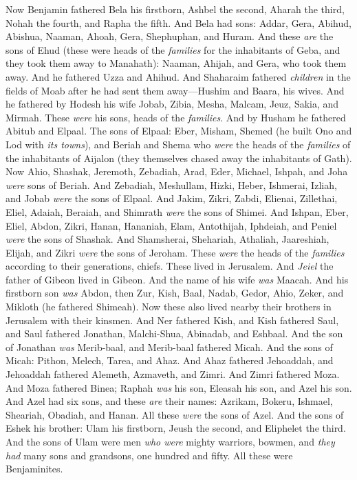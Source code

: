 \begin{biblechapter} %
 Now Benjamin fathered Bela his firstborn, Ashbel the second, Aharah the third,
\verse Nohah the fourth, and Rapha the fifth.
\verse And Bela had sons: Addar, Gera, Abihud,
\verse Abishua, Naaman, Ahoah,
\verse Gera, Shephuphan, and Huram.
\verse And these \textit{are} the sons of Ehud (these were heads of the \textit{families} for the inhabitants of Geba, and they took them away to Manahath):
\verse Naaman, Ahijah, and Gera, who took them away. And he fathered Uzza and Ahihud.
\verse And Shaharaim fathered \textit{children} in the fields of Moab after he had sent them away—Hushim and Baara, his wives.
\verse And he fathered by Hodesh his wife Jobab, Zibia, Mesha, Malcam,
\verse Jeuz, Sakia, and Mirmah. These \textit{were} his sons, heads of the \textit{families}.
\verse And by Husham he fathered Abitub and Elpaal.
\verse The sons of Elpaal: Eber, Misham, Shemed (he built Ono and Lod with \textit{its towns}),
\verse and Beriah and Shema who \textit{were} the heads of the \textit{families} of the inhabitants of Aijalon (they themselves chased away the inhabitants of Gath).
\verse Now Ahio, Shashak, Jeremoth,
\verse Zebadiah, Arad, Eder,
\verse Michael, Ishpah, and Joha \textit{were} sons of Beriah.
\verse And Zebadiah, Meshullam, Hizki, Heber,
\verse Ishmerai, Izliah, and Jobab \textit{were} the sons of Elpaal.
\verse And Jakim, Zikri, Zabdi,
\verse Elienai, Zillethai, Eliel,
\verse Adaiah, Beraiah, and Shimrath \textit{were} the sons of Shimei.
\verse And Ishpan, Eber, Eliel,
\verse Abdon, Zikri, Hanan,
\verse Hananiah, Elam, Antothijah,
\verse Iphdeiah, and Peniel \textit{were} the sons of Shashak.
\verse And Shamsherai, Shehariah, Athaliah,
\verse Jaareshiah, Elijah, and Zikri \textit{were} the sons of Jeroham.
\verse These \textit{were} the heads of the \textit{families} according to their generations, chiefs. These lived in Jerusalem.
\verse And \textit{Jeiel} the father of Gibeon lived in Gibeon. And the name of his wife \textit{was} Maacah.
\verse And his firstborn son \textit{was} Abdon, then Zur, Kish, Baal, Nadab,
\verse Gedor, Ahio, Zeker,
\verse and Mikloth (he fathered Shimeah). Now these also lived nearby their brothers in Jerusalem with their kinsmen.
\verse And Ner fathered Kish, and Kish fathered Saul, and Saul fathered Jonathan, Malchi-Shua, Abinadab, and Eshbaal.
\verse And the son of Jonathan \textit{was} Merib-baal, and Merib-baal fathered Micah.
\verse And the sons of Micah: Pithon, Melech, Tarea, and Ahaz.
\verse And Ahaz fathered Jehoaddah, and Jehoaddah fathered Alemeth, Azmaveth, and Zimri. And Zimri fathered Moza.
\verse And Moza fathered Binea; Raphah \textit{was} his son, Eleasah his son, and Azel his son.
\verse And Azel had six sons, and these \textit{are} their names: Azrikam, Bokeru, Ishmael, Sheariah, Obadiah, and Hanan. All these \textit{were} the sons of Azel.
\verse And the sons of Eshek his brother: Ulam his firstborn, Jeush the second, and Eliphelet the third.
\verse And the sons of Ulam were men \textit{who were} mighty warriors, bowmen, and \textit{they had} many sons and grandsons, one hundred and fifty. All these were Benjaminites.
\end{biblechapter}

